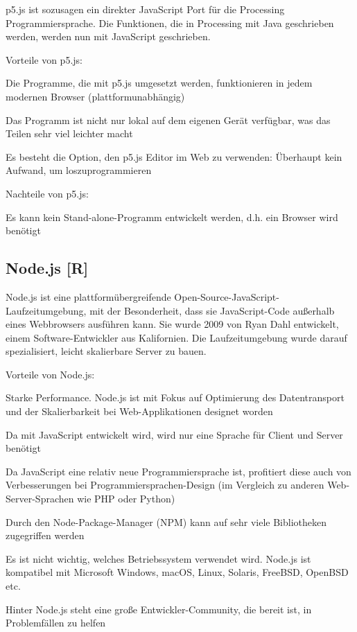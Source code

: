 p5.js ist sozusagen ein direkter JavaScript Port für die Processing Programmiersprache. Die Funktionen, die in Processing mit Java geschrieben werden, werden nun mit JavaScript geschrieben. \cite{p5_proc_difference}

Vorteile von p5.js:
\begin{compactitem}
    \item Die Programme, die mit p5.js umgesetzt werden, funktionieren in jedem modernen Browser (plattformunabhängig)
    \item Das Programm ist nicht nur lokal auf dem eigenen Gerät verfügbar, was das Teilen sehr viel leichter macht
    \item Es besteht die Option, den p5.js Editor im Web zu verwenden: Überhaupt kein Aufwand, um loszuprogrammieren
\end{compactitem}

Nachteile von p5.js:
\begin{compactitem}
    \item Es kann kein Stand-alone-Programm entwickelt werden, d.h. ein Browser wird benötigt
\end{compactitem}


\subsection {Node.js [R]}
Node.js ist eine plattformübergreifende Open-Source-JavaScript-Laufzeitumgebung, mit der Besonderheit, dass sie JavaScript-Code außerhalb eines Webbrowsers ausführen kann.
Sie wurde 2009 von Ryan Dahl entwickelt, einem Software-Entwickler aus Kalifornien.
Die Laufzeitumgebung wurde darauf spezialisiert, leicht skalierbare Server zu bauen. \cite{nodejs}

Vorteile von Node.js: \cite{nodejs_vorteile}

\begin{compactitem}
    \item Starke Performance. Node.js ist mit Fokus auf Optimierung des Datentransport und der Skalierbarkeit bei Web-Applikationen designet worden
    \item Da mit JavaScript entwickelt wird, wird nur eine Sprache für Client und Server benötigt
    \item Da JavaScript eine relativ neue Programmiersprache ist, profitiert diese auch von Verbesserungen bei Programmiersprachen-Design (im Vergleich zu anderen Web-Server-Sprachen wie PHP oder Python)
    \item Durch den Node-Package-Manager (NPM) kann auf sehr viele Bibliotheken zugegriffen werden
    \item Es ist nicht wichtig, welches Betriebssystem verwendet wird. Node.js ist kompatibel mit Microsoft Windows, macOS, Linux, Solaris, FreeBSD, OpenBSD etc.
    \item Hinter Node.js steht eine große Entwickler-Community, die bereit ist, in Problemfällen zu helfen
\end{compactitem}


